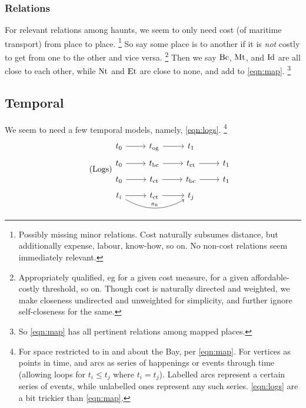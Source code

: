 		\subsubsection{Relations}
		For relevant relations among haunts, we seem to only need cost (of maritime transport) from place to place.%
		\footnote{Possibly missing minor relations. Cost naturally subsumes distance, but additionally expense, labour, know-how, so on. No non-cost relations seem immediately relevant.}
		So say some place is  to another if it is \emph{not} costly to get from one to the other and vice versa.%
		\footnote{Appropriately qualified, eg for a given cost measure, for a given affordable-costly threshold, so on. Though cost is naturally directed and weighted, we make closeness undirected and unweighted for simplicity, and further ignore self-closeness for the same.}
		Then we say \(\operatorname{Bc}\), \(\operatorname{Mt}\), and \(\operatorname{Id}\) are all close to each other, while \(\operatorname{Nt}\) and \(\operatorname{Et}\) are close to none, and add to \ref{eqn:map}.%
		\footnote{So \ref{eqn:map} has all pertinent relations among mapped places.}
	\subsection{Temporal}
	\label{ss:temporal}
		We seem to need a few temporal models, namely, \ref{eqn:logs}.%
		\footnote{For space restricted to in and about the Bay, per \ref{eqn:map}. For vertices as points in time, and arcs as series of happenings or events through time (allowing loops for \(t_i\leq t_j\) where \(t_i=t_j\)). Labelled arcs represent a certain series of events, while unlabelled ones represent any such series. \ref{eqn:logs} are a bit trickier than \ref{eqn:map}.}
		\begin{equation}
		\tag{Logs}
		\label{eqn:logs}
		\begin{tikzcd}[row sep=tiny]
		t_0 \rar &t_{\og} \rar &t_1\\
		t_0 \rar &t_{\buc} \rar &t_{\ct} \rar &t_1\\
		t_0 \rar &t_{\ct} \rar &t_{\buc} \rar &t_1\\
		t_i \rar \ar[rr,bend right,"a_k"] &t_{\ct} \rar &t_j
		\end{tikzcd}
		\end{equation}
		
